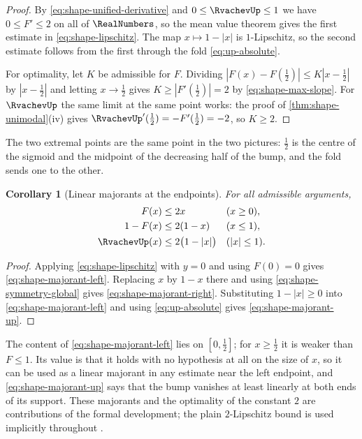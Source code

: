 \documentclass[11pt,oneside]{article}
\newtheorem{corollary}[theorem]{Corollary}
\theoremstyle{definition}
\theoremstyle{remark}
\begin{document}
\begin{proof}
By \eqref{eq:shape-unified-derivative} and $0\le\RvachevUp\le1$ we have $0\le F'\le2$ on all of
$\RealNumbers$, so the mean value theorem gives the first estimate in \eqref{eq:shape-lipschitz}.  The
map $x\mapsto1-|x|$ is $1$-Lipschitz, so the second estimate follows from the first through
the fold \eqref{eq:up-absolute}.

For optimality, let $K$ be admissible for $F$.  Dividing $|F(x)-F(\tfrac12)|\le K|x-\tfrac12|$
by $|x-\tfrac12|$ and letting $x\to\tfrac12$ gives $K\ge|F'(\tfrac12)|=2$ by
\eqref{eq:shape-max-slope}.  For $\RvachevUp$ the same limit at the same point works: the proof of
\cref{thm:shape-unimodal}(iv) gives $\RvachevUp'(\tfrac12)=-F'(\tfrac12)=-2$, so $K\ge2$.
\end{proof}

The two extremal points are the same point in the two pictures: $\tfrac12$ is the centre of
the sigmoid and the midpoint of the decreasing half of the bump, and the fold sends one to
the other.

\begin{corollary}[Linear majorants at the endpoints]
\label{thm:shape-majorants}
For all admissible arguments,
\begin{align}
 F(x)&\le2x                       &&(x\ge0),   \label{eq:shape-majorant-left}\\
 1-F(x)&\le2(1-x)                 &&(x\le1),   \label{eq:shape-majorant-right}\\
 \RvachevUp(x)&\le2\bigl(1-|x|\bigr)     &&(|x|\le1). \label{eq:shape-majorant-up}
\end{align}
\end{corollary}

\begin{proof}
Applying \eqref{eq:shape-lipschitz} with $y=0$ and using $F(0)=0$ gives
\eqref{eq:shape-majorant-left}.  Replacing $x$ by $1-x$ there and using
\eqref{eq:shape-symmetry-global} gives \eqref{eq:shape-majorant-right}.  Substituting
$1-|x|\ge0$ into \eqref{eq:shape-majorant-left} and using \eqref{eq:up-absolute} gives
\eqref{eq:shape-majorant-up}.
\end{proof}

The content of \eqref{eq:shape-majorant-left} lies on $[0,\tfrac12]$; for $x\ge\tfrac12$ it is
weaker than $F\le1$.  Its value is that it holds with no hypothesis at all on the size of
$x$, so it can be used as a linear majorant in any estimate near the left endpoint, and
\eqref{eq:shape-majorant-up} says that the bump vanishes at least linearly at both ends of
its support.  These majorants and the optimality of the constant $2$ are contributions of the
formal development; the plain $2$-Lipschitz bound is used implicitly throughout
\cite{arias1982,rvachev1990}.
\end{document}
